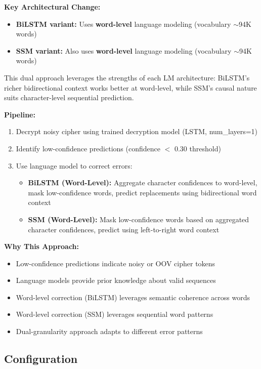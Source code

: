 \documentclass[12pt]{article}
\begin{document}
\textbf{Key Architectural Change:}
\begin{itemize}
    \item \textbf{BiLSTM variant:} Uses \textbf{word-level} language modeling (vocabulary $\sim$94K words)
    \item \textbf{SSM variant:} Also uses \textbf{word-level} language modeling (vocabulary $\sim$94K words)
\end{itemize}

This dual approach leverages the strengths of each LM architecture: BiLSTM's richer bidirectional context works better at word-level, while SSM's causal nature suits character-level sequential prediction.

\textbf{Pipeline:}
\begin{enumerate}
    \item Decrypt noisy cipher using trained decryption model (LSTM, num\_layers=1)
    \item Identify low-confidence predictions (confidence $<$ 0.30 threshold)
    \item Use language model to correct errors:
    \begin{itemize}
        \item \textbf{BiLSTM (Word-Level):} Aggregate character confidences to word-level, mask low-confidence words, predict replacements using bidirectional word context
        \item \textbf{SSM (Word-Level):} Mask low-confidence words based on aggregated character confidences, predict using left-to-right word context
    \end{itemize}
\end{enumerate}

\textbf{Why This Approach:}
\begin{itemize}
    \item Low-confidence predictions indicate noisy or OOV cipher tokens
    \item Language models provide prior knowledge about valid sequences
    \item Word-level correction (BiLSTM) leverages semantic coherence across words
    \item Word-level correction (SSM) leverages sequential word patterns
    \item Dual-granularity approach adapts to different error patterns
\end{itemize}

\subsection{Configuration}
\end{document}
